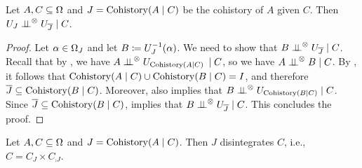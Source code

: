 \documentclass[USenglish,onecolumn]{article}
\begin{document}
\begin{lemma}
  \label{lemma:cohistory_has_independence_property}
  Let $A, C \subseteq \Omega$ and $J = \operatorname{Cohistory}(A \mid C)$ be the cohistory of $A$ given $C$.
  Then $U_J \mathrel{\perp\!\!\!\perp}^\otimes U_{{\overline{J}}} \mid C$.
\end{lemma}

\begin{proof}
  Let $\alpha \in \Omega_{J}$ and let $B \coloneq U_J^{-1}(\alpha)$.
  We need to show that $B \mathrel{\perp\!\!\!\perp}^\otimes U_{{\overline{J}}} \mid C$.
  Recall that by , we have
  $A \mathrel{\perp\!\!\!\perp}^\otimes U_{\operatorname{Cohistory}(A\mid C)}$
  $ \mid C$, so we have $A \mathrel{\perp\!\!\!\perp}^\otimes B \mid C$. By , it follows that $\operatorname{Cohistory}(A \mid C) \cup \operatorname{Cohistory}(B \mid C) = I$, and therefore ${\overline{J}} \subseteq \operatorname{Cohistory}(B \mid C)$. Moreover,
   also implies that
  $B \mathrel{\perp\!\!\!\perp}^\otimes U_{\operatorname{Cohistory}(B \mid C)} \mid C$.
  Since ${\overline{J}}\subseteq \operatorname{Cohistory}(B\mid C) $,  implies that
  $B \mathrel{\perp\!\!\!\perp}^\otimes U_{{\overline{J}}} \mid C$.
  This concludes the proof.
\end{proof}

\begin{lemma}
  \label{lemma:cohistory_disintegrates}
  Let $A, C \subseteq \Omega$ and $J = \operatorname{Cohistory}(A \mid C)$.
  Then $J$ disintegrates $C$, i.e., $C = C_J \times C_{\comp{J}}$.
\end{lemma}
\end{document}

